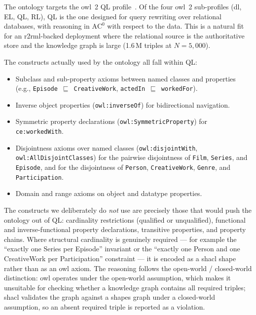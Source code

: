 The ontology targets the \ac{owl}~2 QL profile~\cite{owl2profiles}. Of the four \ac{owl}~2 sub-profiles (\ac{dl}, EL, QL, RL), QL is the one designed for query rewriting over relational databases, with reasoning in $\mathrm{AC}^0$ with respect to the data. This is a natural fit for an \ac{r2rml}-backed deployment where the relational source is the authoritative store and the knowledge graph is large (1.6\,M triples at $N = 5{,}000$).

The constructs actually used by the ontology all fall within QL:

\begin{itemize}
  \item \begin{sloppypar}Subclass and sub-property axioms between named classes and properties (e.g., \texttt{Episode}~$\sqsubseteq$~\texttt{CreativeWork}, \texttt{actedIn}~$\sqsubseteq$~\texttt{workedFor}).\end{sloppypar}
  \item Inverse object properties (\texttt{owl:inverseOf}) for bidirectional navigation.
  \item Symmetric property declarations (\texttt{owl:SymmetricProperty}) for \texttt{ce:workedWith}.
  \item Disjointness axioms over named classes (\texttt{owl:disjointWith}, \texttt{owl:AllDisjointClasses}) for the pairwise disjointness of \texttt{Film}, \texttt{Series}, and \texttt{Episode}, and for the disjointness of \texttt{Person}, \texttt{CreativeWork}, \texttt{Genre}, and \texttt{Participation}.
  \item Domain and range axioms on object and datatype properties.
\end{itemize}

The constructs we deliberately do \emph{not} use are precisely those that would push the ontology out of QL: cardinality restrictions (qualified or unqualified), functional and inverse-functional property declarations, transitive properties, and property chains. Where structural cardinality is genuinely required --- for example the ``exactly one Series per Episode'' invariant or the ``exactly one Person and one CreativeWork per Participation'' constraint --- it is encoded as a \ac{shacl} shape rather than as an \ac{owl} axiom. The reasoning follows the open-world / closed-world distinction: \ac{owl} operates under the open-world assumption, which makes it unsuitable for checking whether a knowledge graph contains all required triples; \ac{shacl} validates the graph against a shapes graph under a closed-world assumption, so an absent required triple is reported as a violation.

